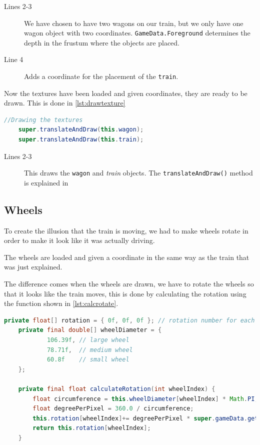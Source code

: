 \begin{description}
\item[Lines 2-3] We have chosen to have two wagons on our train, but we only have one wagon object with two coordinates. \lstinline|GameData.Foreground| determines the depth in the frustum where the objects are placed.
\item[Line 4] Adds a coordinate for the placement of the \lstinline|train|.
\end{description}

Now the textures have been loaded and given coordinates, they are ready to be drawn. This is done in \autoref{lst:drawtexture}

\begin{lstlisting}[language=java,firstnumber=1,caption={Drawing the texture on the screen.},label=lst:drawtexture] 
	//Drawing the textures
	super.translateAndDraw(this.wagon);
	super.translateAndDraw(this.train);
\end{lstlisting}

\begin{description}
\item[Lines 2-3] This draws the \lstinline|wagon| and \textit{train} objects. The \lstinline|translateAndDraw()| method is explained in 
\end{description}

\subsection{Wheels}

To create the illusion that the train is moving, we had to make wheels rotate in order to make it look like it was actually driving. 

The wheels are loaded and given a coordinate in the same way as the train that was just explained.

The difference comes when the wheels are drawn, we have to rotate the wheels so that it looks like the train moves, this is done by calculating the rotation using the function shown in \autoref{lst:calcrotate}.

\begin{lstlisting}[language=java,firstnumber=1,caption={Calculating the wheel rotation.},label=lst:calcrotate]
    private float[] rotation = { 0f, 0f, 0f }; // rotation number for each wheel size
    private final double[] wheelDiameter = {
            106.39f, // large wheel
            78.71f,  // medium wheel
            60.8f    // small wheel
    };

    private final float calculateRotation(int wheelIndex) {    
        float circumference = this.wheelDiameter[wheelIndex] * Math.PI;
        float degreePerPixel = 360.0 / circumference;
        this.rotation[wheelIndex]+= degreePerPixel * super.gameData.getPixelMovement();
        return this.rotation[wheelIndex];
    }
\end{lstlisting}

